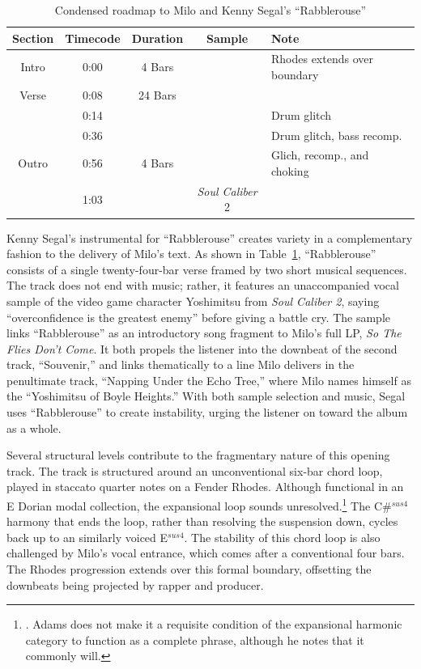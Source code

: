 \begin{table}[ht]
    \centering
        \begin{tabular}{|c|c|c|c|l|}
             \hline
            Section & Timecode & Duration & Sample                  & Note \\ \hline
            Intro   & 0:00     & 4 Bars   &                         & Rhodes extends over boundary \\ \hline
            Verse   & 0:08     & 24 Bars  &                         & \\ \hline
                    & 0:14     &          &                         & Drum glitch \\ \hline
                    & 0:36     &          &                         & Drum glitch, bass recomp. \\ \hline
            Outro   & 0:56     & 4 Bars   &                         & Glich, recomp., and choking \\ \hline
                    & 1:03     &          & \textit{Soul Caliber} 2 & \\ \hline
        \end{tabular}
    \caption{Condensed roadmap to Milo and Kenny Segal's ``Rabblerouse''}
    \label{tab:rabblerouse}
\end{table}

Kenny Segal's instrumental for ``Rabblerouse'' creates variety in a complementary fashion to the 
delivery of Milo's text. As shown in Table~\ref{tab:rabblerouse}, ``Rabblerouse'' consists of a single
twenty-four-bar verse framed by two short musical sequences. The track does not end with music; rather, 
it features an unaccompanied vocal sample of the video game character Yoshimitsu from \emph{Soul Caliber 2},
saying ``overconfidence is the greatest enemy'' before giving a battle cry. The sample links ``Rabblerouse''
as an introductory song fragment to Milo's full LP, \emph{So The Flies Don't Come}. It both propels the
listener into the downbeat of the second track, ``Souvenir,'' and links thematically to a line Milo 
delivers in the penultimate track, ``Napping Under the Echo Tree,'' where Milo names himself as the
``Yoshimitsu of Boyle Heights.'' With both sample selection and music, Segal uses ``Rabblerouse'' to 
create instability, urging the listener on toward the album as a whole.

Several structural levels contribute to the fragmentary nature of this opening track. The track is 
structured around an unconventional six-bar chord loop, played in staccato quarter notes on a Fender
Rhodes. Although functional in an E Dorian modal collection, the expansional loop sounds
unresolved.\footnote{\cite{kyleadamsHarmonicSyntacticMotivic2020}. Adams does not make it a 
requisite condition of the expansional harmonic category to function as a complete phrase, although 
he notes that it commonly will.} The C\#$^{sus4}$ harmony that ends the loop, rather than resolving 
the suspension down, cycles back up to an similarly voiced E$^{sus4}$. The stability of this chord 
loop is also challenged by Milo's vocal entrance, which comes after a conventional four bars. The 
Rhodes progression extends over this formal boundary, offsetting the downbeats being projected by 
rapper and producer.

